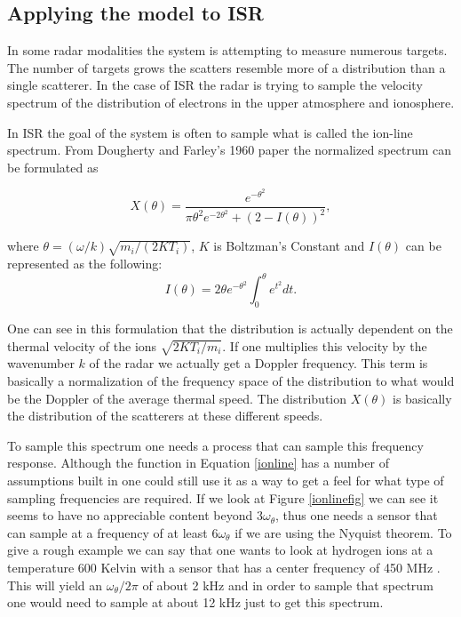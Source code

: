 \subsection{Applying the model to ISR}
In some radar modalities the system is attempting to measure numerous targets.  The number of targets grows the scatters resemble more of a distribution than a single scatterer.  In the case of ISR the radar is trying to sample the velocity spectrum of the distribution of electrons in the upper atmosphere and ionosphere.  

In ISR the goal of the system is often to sample what is called the ion-line spectrum.  From Dougherty and Farley's 1960 paper \cite{dougherty:farley1960} the normalized spectrum can be formulated as 

\begin{equation}
\label{ionline}
X(\theta) = \frac{e^{-\theta^2}}{\pi \theta^2 e^{-2\theta^2}+(2-I(\theta))^2},
\end{equation}

\noindent where $\theta=(\omega/k)\sqrt{m_i/(2KT_i)}$, $K$ is Boltzman's Constant and $I(\theta)$ can be represented as the following:
\begin{equation}
\label{Ifunc}
I(\theta) = 2\theta e^{-\theta^2}\int_0^\theta e^{t^2}dt.
\end{equation}



One can see in this formulation that the distribution is actually dependent on the thermal velocity of the ions $\sqrt{2KT_i/m_i}$.  If one multiplies this velocity by the wavenumber $k$ of the radar we actually get a Doppler frequency.  This term is basically a normalization of the frequency space of the distribution to what would be the Doppler of the average thermal speed.  The distribution $X(\theta)$ is basically the distribution of the scatterers at these different speeds.

To sample this spectrum one needs a process that can sample this frequency response.  Although the function in Equation \ref{ionline} has a number of assumptions built in one could still use it as a way to get a feel for what type of sampling frequencies are required.  If we look at Figure \ref{ionlinefig} we can see it seems to have no appreciable content beyond $3\omega_\theta$, thus one needs a sensor that can sample at a frequency of at least $6\omega_\theta$ if we are using the Nyquist theorem.  To give a rough example we can say that one wants to look at hydrogen ions at a  temperature 600 Kelvin with a sensor that has a center frequency of 450 MHz \footnotemark[1].  This will yield an $\omega_\theta/2\pi$ of about 2 kHz and in order to sample that spectrum one would need to sample at about 12 kHz just to get this spectrum.
  
